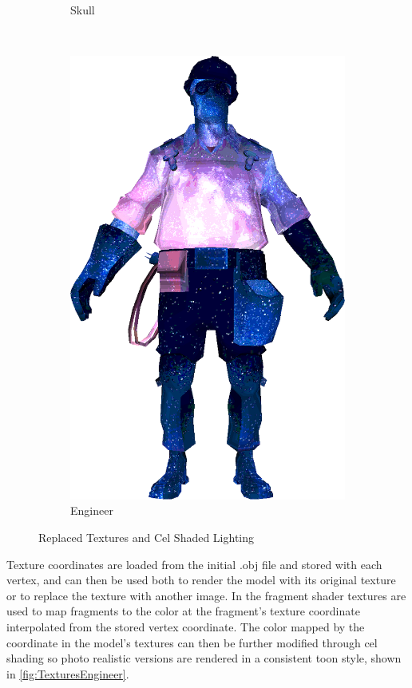 \begin{figure}[h]
\begin{subfigure}[b]{0.16\textwidth}
        \caption{Skull}
        \label{fig:TextureReplacementSkull}
    \end{subfigure}
~
\hspace{24pt}
~
    \centering
    \begin{subfigure}[b]{0.13\textwidth}
        \includegraphics[width=\textwidth]{img/Combined/SpaceEngineerNoContour.png}
        \caption{Engineer}
        \label{fig:TextureReplacement}
    \end{subfigure}
    \caption{Replaced Textures and Cel Shaded Lighting}
    \label{fig:TexturesReplacement}
\end{figure}

Texture coordinates are loaded from the initial .obj file and stored with each vertex, and can then be used 
both to render the model with its original texture or to replace the texture with another image. In the fragment 
shader textures are used to map fragments to the color at the fragment's texture coordinate interpolated from the 
stored vertex coordinate. The color mapped by the coordinate in the model's textures can then be further modified 
through cel shading so photo realistic versions are rendered in a consistent toon style, shown in \autoref{fig:TexturesEngineer}.

